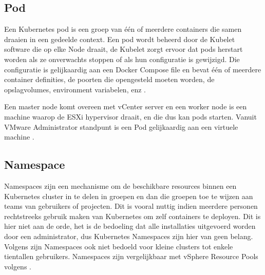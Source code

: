 \subsection{Pod}
Een Kubernetes pod is een groep van \'e\'en of meerdere containers die samen draaien in een gedeelde context. Een pod wordt beheerd door de Kubelet software die op elke Node draait, de Kubelet zorgt ervoor dat pods herstart worden als ze onverwachts stoppen of als hun configuratie is gewijzigd. Die configuratie is gelijkaardig aan een Docker Compose file en bevat één of meerdere container definities, de poorten die opengesteld moeten worden, de opslagvolumes, environment variabelen, enz 
\autocite{NirShtein2023}.

Een master node komt overeen met vCenter server en een worker node is een machine waarop de ESXi hypervisor draait, en die dus kan pods starten. Vanuit VMware Administrator standpunt is een Pod gelijkaardig aan een virtuele machine \autocite{VMware2019}.


\subsection{Namespace}
Namespaces zijn een mechanisme om de beschikbare resources binnen een Kubernetes cluster in te delen in groepen en dan die groepen toe te wijzen aan teams van gebruikers of projecten. Dit is vooral nuttig indien meerdere personen rechtstreeks gebruik maken van Kubernetes om zelf containers te deployen. Dit is hier niet aan de orde, het is de bedoeling dat alle installaties uitgevoerd worden door een administrator, dus Kubernetes Namespaces zijn hier van geen belang. Volgens \textcite{Kubernetes2023c} zijn Namespaces ook niet bedoeld voor kleine clusters tot enkele tientallen gebruikers. Namespaces zijn vergelijkbaar met vSphere Resource Pools volgens \textcite{VMware2019}.
